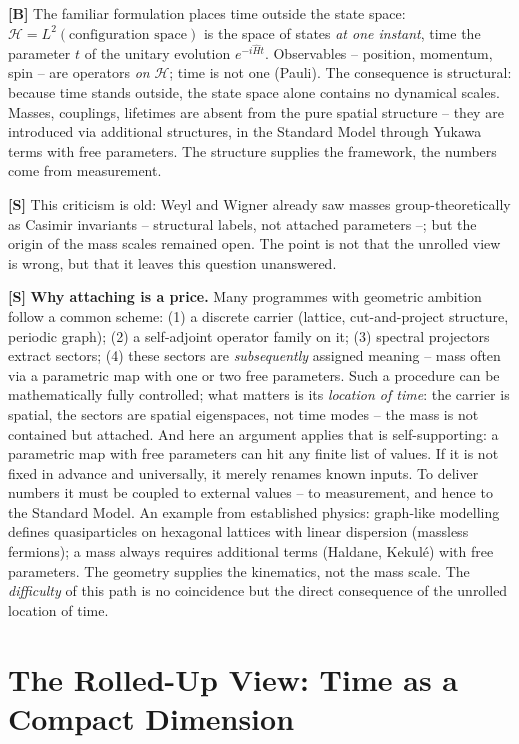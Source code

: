 \textbf{[B]} The familiar formulation places time outside the state space:
$\mathcal H = L^2(\text{configuration space})$ is the space of states \emph{at
one instant}, time the parameter $t$ of the unitary evolution $e^{-i\hat H t}$.
Observables -- position, momentum, spin -- are operators \emph{on} $\mathcal H$;
time is not one (Pauli). The consequence is structural: because time stands
outside, the state space alone contains no dynamical scales. Masses, couplings,
lifetimes are absent from the pure spatial structure -- they are introduced via
additional structures, in the Standard Model through Yukawa terms with free
parameters. The structure supplies the framework, the numbers come from
measurement.

\textbf{[S]} This criticism is old: Weyl and Wigner already saw masses
group-theoretically as Casimir invariants -- structural labels, not attached
parameters --; but the origin of the mass scales remained open. The point is
not that the unrolled view is wrong, but that it leaves this question unanswered.

\textbf{[S]} \textbf{Why attaching is a price.} Many programmes with geometric
ambition follow a common scheme: (1) a discrete carrier (lattice,
cut-and-project structure, periodic graph); (2) a self-adjoint operator family
on it; (3) spectral projectors extract sectors; (4) these sectors are
\emph{subsequently} assigned meaning -- mass often via a parametric map with one
or two free parameters. Such a procedure can be mathematically fully controlled;
what matters is its \emph{location of time}: the carrier is spatial, the sectors
are spatial eigenspaces, not time modes -- the mass is not contained but
attached. And here an argument applies that is self-supporting: a parametric
map with free parameters can hit any finite list of values. If it is not fixed
in advance and universally, it merely renames known inputs. To deliver numbers
it must be coupled to external values -- to measurement, and hence to the
Standard Model. An example from established physics: graph-like modelling
defines quasiparticles on hexagonal lattices with linear dispersion (massless
fermions); a mass always requires additional terms (Haldane, Kekulé) with free
parameters. The geometry supplies the kinematics, not the mass scale. The
\emph{difficulty} of this path is no coincidence but the direct consequence of
the unrolled location of time.

\section{The Rolled-Up View: Time as a Compact Dimension}

